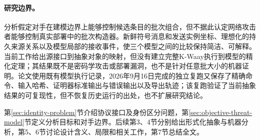 \paragraph{研究边界。}
分析假定对手在建模边界上能够控制候选条目的批次组合，但不据此认定网络攻击者能够控制真实部署中的批次构造器。新鲜符号消息和发送实例坐标、理想化的持久来源关系以及模型局部的接收事件，使三个模型之间的比较保持简洁、可解释。当前工作给出源接口到抽象对象的映射，但没有建立完整K-Waay执行到模型的精化定理；其结果既不是密码学攻击或部署漏洞，也不是针对任意批大小的机器证明。论文使用既有模型执行记录，2026年9月16日完成的独立复跑又保存了精确命令、输入哈希、证明器标准输出与错误输出以及导出轨迹；该复跑验证了当前抽象结果的可复现性，但不恢复历史运行的出处，也不扩展研究结论。

第\ref{sec:identity-problem}节介绍协议接口及身份区分问题，第\ref{sec:objective-threat-model}节定义分析目标和对手边界。后续第3、4节分别给出形式化抽象与机器分析，第5、6节讨论设计含义、局限和相关工作，第7节总结全文。
